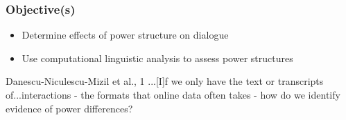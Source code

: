 \documentclass{beamer}
\begin{document}

\begin{frame}
\frametitle{Objective(s)}
\begin{itemize}
\item Determine effects of power structure on dialogue
\item Use computational linguistic analysis to assess power structures

\end{itemize}
\begin{block}{Danescu-Niculescu-Mizil et al., 1}
...[I]f we only have the text or transcripts of...interactions - the formats that online data often takes - how do we identify evidence of power differences?
\end{block}
\end{frame}
\end{document}
